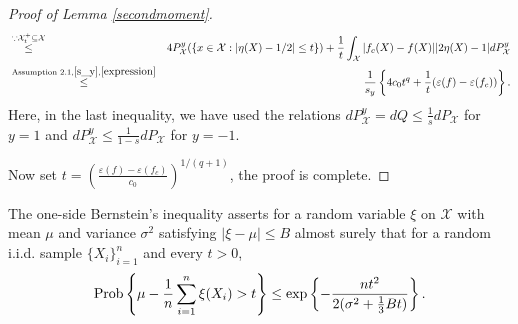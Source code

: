 \documentclass{article}
\begin{document}
\begin{proof}[Proof of Lemma \ref{secondmoment}]
\begin{eqnarray*}
   &\stackrel{\because \mathcal{X}_t^+ \subseteq \mathcal{X}}{\leq} & 4 {P_\mathcal{X}^y}(\{x\in \mathcal{X}: |\eta(X)-1/2| \leq t\}) + 
   \frac{1}{t}\int_{\mathcal{X}}  |f_c(X) -f(X)| |2\eta(X)-1| d{P_\mathcal{X}^y}\\
   &\stackrel{\text{Assumption 2.1}, \eqref{s_y}, \eqref{expression}}{\leq} & \frac{1}{s_y}\left\{4c_0t^q + \frac{1}{t}(\varepsilon(f) - \varepsilon(f_c))\right\}.
\end{eqnarray*}
Here, in the last inequality, we have used the relations $d{P_\mathcal{X}^y} = dQ \leq \frac{1}{s}dP_\mathcal{X}$ for $y=1$ and $d{P_\mathcal{X}^y} \leq \frac{1}{1-s}dP_\mathcal{X}$ for $y=-1$. 


Now set $t= \left(\frac{\varepsilon(f) - \varepsilon(f_c)}{c_0}\right)^{1/(q+1)}$, the proof is complete.
\end{proof}

The one-side Bernstein's inequality asserts for a random variable $\xi$ on ${\mathcal X}$ with mean $\mu$ and variance $\sigma^2$ satisfying $|\xi - \mu|\le B$ almost surely that for a random i.i.d. sample $\{X_i\}_{i=1}^n$ and every
$t>0$, 
\begin{equation}\label{Bernstein}
 \hbox{Prob} \left\{\mu- \frac{1}{n}\sum_{i=1}^n \xi(X_i) >t \right\} \leq \exp \left\{-
{n t^{2} \over 2(\sigma^2 +{1 \over 3} B t)}\right\}.   
\end{equation}
\end{document}

